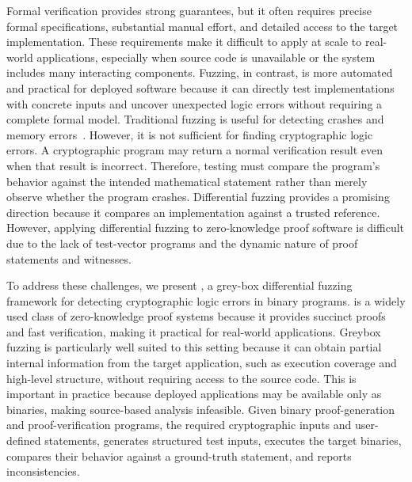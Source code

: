
Formal verification provides strong guarantees, but it often requires precise formal specifications, substantial manual effort, and detailed access to the target implementation. These requirements make it difficult to apply at scale to real-world \zksnark applications, especially when source code is unavailable or the system includes many interacting components. Fuzzing, in contrast, is more automated and practical for deployed software because it can directly test implementations with concrete inputs and uncover unexpected logic errors without requiring a complete formal model. Traditional fuzzing is useful for detecting crashes and memory errors~\cite{AFLplusplus,google_afl_based_fuzzers_overview}. However, it is not sufficient for finding cryptographic logic errors. A cryptographic program may return a normal verification result even when that result is incorrect. Therefore, testing must compare the program's behavior against the intended mathematical statement rather than merely observe whether the program crashes. Differential fuzzing provides a promising direction because it compares an implementation against a trusted reference. However, applying differential fuzzing to zero-knowledge proof software is difficult due to the lack of test-vector programs and the dynamic nature of proof statements and witnesses.

To address these challenges, we present \greyboxfuzz, a grey-box differential fuzzing framework for detecting cryptographic logic errors in \zksnark binary programs. \zksnark is a widely used class of zero-knowledge proof systems because it provides succinct proofs and fast verification, making it practical for real-world applications. Greybox fuzzing is particularly well suited to this setting because it can obtain partial internal information from the target application, such as execution coverage and high-level structure, without requiring access to the source code. This is important in practice because deployed \zksnark applications may be available only as binaries, making source-based analysis infeasible. Given binary proof-generation and proof-verification programs, the required cryptographic inputs and user-defined statements, \greyboxfuzz generates structured test inputs, executes the target binaries, compares their behavior against a ground-truth statement, and reports inconsistencies.

